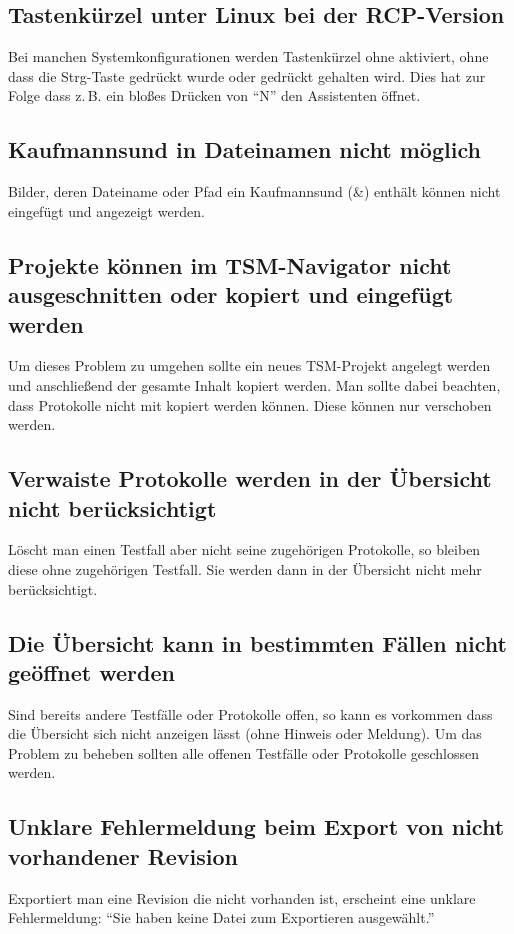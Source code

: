 \documentclass[11pt,a4paper,titlepage]{article}
\begin{document}
\subsection*{Tastenkürzel unter Linux bei der RCP-Version}
Bei manchen Systemkonfigurationen werden Tastenkürzel ohne aktiviert, ohne dass die Strg-Taste gedrückt wurde oder gedrückt gehalten wird.
Dies hat zur Folge dass z.\,B. ein bloßes Drücken von "`N"' den Assistenten öffnet.

\subsection*{Kaufmannsund in Dateinamen nicht möglich}
Bilder, deren Dateiname oder Pfad ein Kaufmannsund (\&) enthält können nicht eingefügt und angezeigt werden.

\subsection*{Projekte können im TSM-Navigator nicht ausgeschnitten oder kopiert und eingefügt werden}
Um dieses Problem zu umgehen sollte ein neues TSM-Projekt angelegt werden und anschließend der gesamte Inhalt kopiert werden.
Man sollte dabei beachten, dass Protokolle nicht mit kopiert werden können. Diese können nur verschoben werden.

\subsection*{Verwaiste Protokolle werden in der Übersicht nicht berücksichtigt}
Löscht man einen Testfall aber nicht seine zugehörigen Protokolle, so bleiben diese ohne zugehörigen Testfall. Sie werden dann in der Übersicht nicht mehr berücksichtigt.

\subsection*{Die Übersicht kann in bestimmten Fällen nicht geöffnet werden}
Sind bereits andere Testfälle oder Protokolle offen, so kann es vorkommen dass die Übersicht sich nicht anzeigen lässt (ohne Hinweis oder Meldung).
Um das Problem zu beheben sollten alle offenen Testfälle oder Protokolle geschlossen werden.

\subsection*{Unklare Fehlermeldung beim Export von nicht vorhandener Revision}
Exportiert man eine Revision die nicht vorhanden ist, erscheint eine unklare Fehlermeldung: "`Sie haben keine Datei zum Exportieren ausgewählt."'
\end{document}
